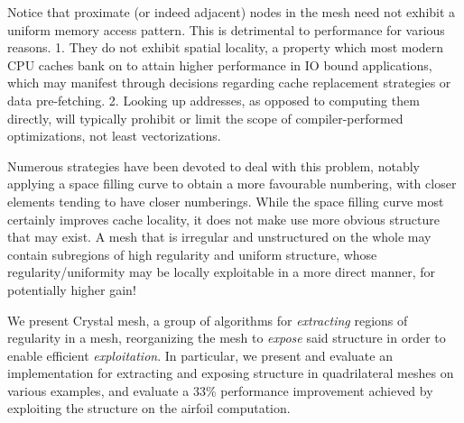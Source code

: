 Notice that proximate (or indeed adjacent) nodes in the mesh need not exhibit a uniform memory access pattern. This is detrimental to performance for various reasons.
1. They do not exhibit spatial locality, a property which most modern CPU caches bank on to attain higher performance in IO bound applications, which may manifest through decisions regarding cache replacement strategies or data pre-fetching.
2. Looking up addresses, as opposed to computing them directly, will typically prohibit or limit the scope of compiler-performed optimizations, not least vectorizations.

Numerous strategies have been devoted to deal with this problem, notably applying a space filling curve to obtain a more favourable numbering, with closer elements tending to have closer numberings. While the space filling curve most certainly improves cache locality, it does not make use more obvious structure that may exist. A mesh that is irregular and unstructured on the whole may contain subregions of high regularity and uniform structure, whose regularity/uniformity may be locally exploitable in a more direct manner, for potentially higher gain!


We present Crystal mesh, a group of algorithms for \emph{extracting} regions of regularity in a mesh, reorganizing the mesh to \emph{expose} said structure in order to enable efficient \emph{exploitation}.
In particular, we present and evaluate an implementation for extracting and exposing structure in quadrilateral meshes on various examples, and evaluate a 33\% performance improvement achieved by exploiting the structure on the airfoil computation.
